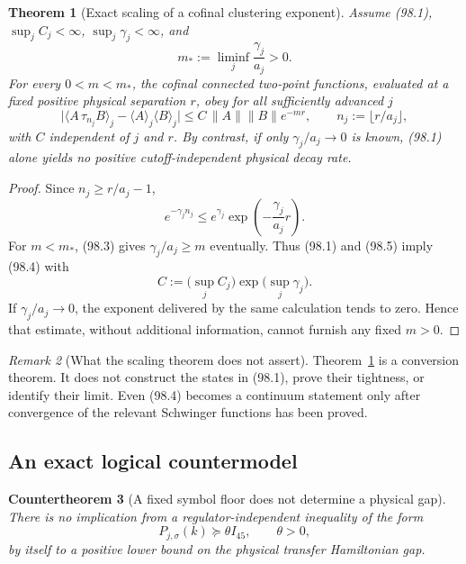 \documentclass[11pt,oneside]{article}
\newtheorem{theorem}{Theorem}[section]
\newtheorem{countertheorem}[theorem]{Countertheorem}
\theoremstyle{definition}
\theoremstyle{remark}
\newtheorem{remark}[theorem]{Remark}
\begin{document}
\begin{theorem}[Exact scaling of a cofinal clustering exponent]
\label{thm:newv98-scaling}
Assume (98.1), \(\sup_j C_j<\infty\),
\(\sup_j\gamma_j<\infty\), and
\[
 m_*:=\liminf_j\frac{\gamma_j}{a_j}>0.              \tag{98.3}
\]
For every \(0<m<m_*\), the cofinal connected two-point functions,
evaluated at a fixed positive physical separation \(r\), obey for
all sufficiently advanced \(j\)
\[
 \bigl|\langle A\,\tau_{n_j}B\rangle_j
       -\langle A\rangle_j\langle B\rangle_j\bigr|
 \leq C\,\|A\|\|B\|e^{-mr},\qquad
 n_j:=\lfloor r/a_j\rfloor,                         \tag{98.4}
\]
with \(C\) independent of \(j\) and \(r\).  By contrast, if only
\(\gamma_j/a_j\to0\) is known, (98.1) alone yields no positive
cutoff-independent physical decay rate.
\end{theorem}

\begin{proof}
Since \(n_j\geq r/a_j-1\),
\[
 e^{-\gamma_jn_j}
 \leq e^{\gamma_j}
      \exp\!\left(-\frac{\gamma_j}{a_j}r\right).
                                                               \tag{98.5}
\]
For \(m<m_*\), (98.3) gives
\(\gamma_j/a_j\geq m\) eventually.  Thus (98.1) and (98.5) imply
(98.4) with
\[
 C:=\bigl(\sup_jC_j\bigr)
       \exp\bigl(\sup_j\gamma_j\bigr).              \tag{98.6}
\]
If \(\gamma_j/a_j\to0\), the exponent delivered by the same
calculation tends to zero.  Hence that estimate, without additional
information, cannot furnish any fixed \(m>0\).
\end{proof}

\begin{remark}[What the scaling theorem does not assert]
\label{rem:newv98-scaling}
Theorem~\ref{thm:newv98-scaling} is a conversion theorem.  It does
not construct the states in (98.1), prove their tightness, or
identify their limit.  Even (98.4) becomes a continuum statement
only after convergence of the relevant Schwinger functions has been
proved.
\end{remark}

\subsection{An exact logical countermodel}

\begin{countertheorem}[A fixed symbol floor does not determine a physical gap]
\label{ctr:newv98-symbol-not-gap}
There is no implication from a regulator-independent inequality of
the form
\[
 P_{j,\sigma}(k)\succeq\theta I_{45},
 \qquad \theta>0,                                    \tag{98.7}
\]
by itself to a positive lower bound on the physical transfer
Hamiltonian gap.
\end{countertheorem}
\end{document}
